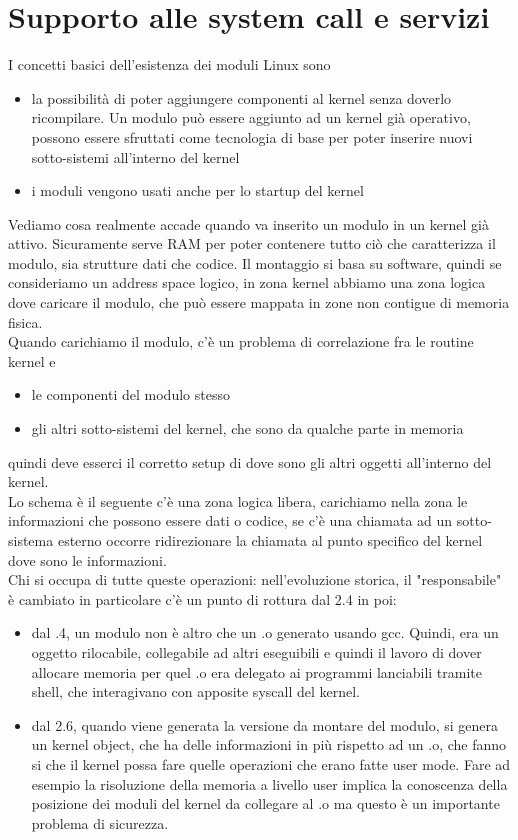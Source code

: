 \documentclass[12pt, oneside]{extbook}
\begin{document}
\section{Supporto alle system call e servizi}
I concetti basici dell'esistenza dei moduli Linux sono
\begin{itemize}
\item la possibilità di poter aggiungere componenti al kernel senza doverlo ricompilare. Un modulo può essere aggiunto ad un kernel già operativo, possono essere sfruttati come tecnologia di base per poter inserire nuovi sotto-sistemi all'interno del kernel
\item i moduli vengono usati anche per lo startup del kernel
\end{itemize}
Vediamo cosa realmente accade quando va inserito un modulo in un kernel già attivo. Sicuramente serve RAM per poter contenere tutto ciò che caratterizza il modulo, sia strutture dati che codice. Il montaggio si basa su software, quindi se consideriamo un address space logico, in zona kernel abbiamo una zona logica dove caricare il modulo, che può essere mappata in zone non contigue di memoria fisica.\\Quando carichiamo il modulo, c'è un problema di correlazione fra le routine kernel e 
\begin{itemize}
\item le componenti del modulo stesso
\item gli altri sotto-sistemi del kernel, che sono da qualche parte in memoria
\end{itemize}
quindi deve esserci il corretto setup di dove sono gli altri oggetti all'interno del kernel.\\Lo schema è il seguente
c'è una zona logica libera, carichiamo nella zona le informazioni che possono essere dati o codice, se c'è una chiamata ad un sotto-sistema esterno occorre ridirezionare la chiamata al punto specifico del kernel dove sono le informazioni.\\ Chi si occupa di tutte queste operazioni: nell'evoluzione storica, il "responsabile" è cambiato in particolare c'è un punto di rottura dal 2.4 in poi:
\begin{itemize}
\item dal .4, un modulo non è altro che un .o generato usando gcc. Quindi, era un oggetto rilocabile, collegabile ad altri eseguibili e quindi il lavoro di dover allocare memoria per quel .o era delegato ai programmi lanciabili tramite shell, che interagivano con apposite syscall del kernel.
\item dal 2.6, quando viene generata la versione da montare del modulo, si genera un kernel object, che ha delle informazioni in più rispetto ad un .o, che fanno si che il kernel possa fare quelle operazioni che erano fatte user mode. Fare ad esempio la risoluzione della memoria a livello user implica la conoscenza della posizione dei moduli del kernel da collegare al .o ma questo è un importante problema di sicurezza.
\end{itemize}
\end{document}
